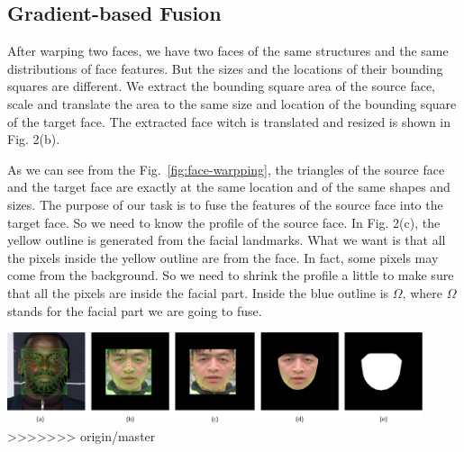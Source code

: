 \begin{center}


\subsection{Gradient-based Fusion}
\label{sec:fusion}


After warping two faces, we have two faces of the same structures and the same distributions of face features. But the sizes and the locations of their bounding squares are different. We extract the bounding square area of the source face, scale and translate the area to the same size and location of the bounding square of the target face. The extracted face witch is translated and resized is shown in Fig. 2(b).

As we can see from the Fig.~\ref{fig:face-warpping}, the triangles of the source face and the target face are exactly at the same location and of the same shapes and sizes. The purpose of our task is to fuse the features of the source face into the target face. So we need to know the profile of the source face. In Fig. 2(c), the yellow outline is generated from the facial landmarks. What we want is that all the pixels inside the yellow outline are from the face. In fact, some pixels may come from the background. So we need to shrink the profile a little to make sure that all the pixels are inside the facial part. Inside the blue outline is $\Omega$, where $\Omega$ stands for the facial part we are going to fuse.



\begin{center}
    \includegraphics[width=4.8in]{images/extract.png}
    \label{fig:face-warpping} 
>>>>>>> origin/master
\end{center}



\end{center}
